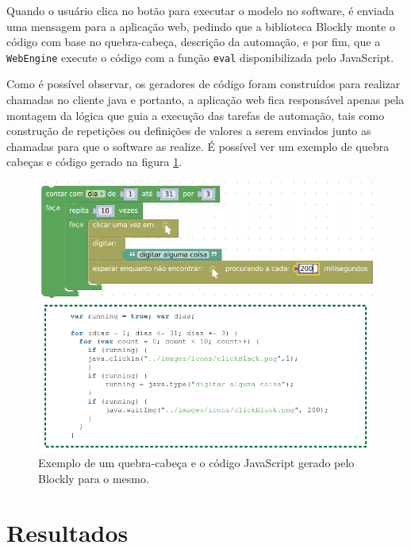\documentclass[tg]{mdtufsm}
\begin{document}
                    Quando o usuário clica no botão para executar o modelo no software, é enviada uma mensagem para a aplicação web, pedindo que a biblioteca Blockly monte o código com base no quebra-cabeça, descrição da automação, e por fim, que a \texttt{WebEngine} execute o código com a função \texttt{eval} disponibilizada pelo JavaScript.

                    Como é possível observar, os geradores de código foram construídos para realizar chamadas no cliente java e portanto, a aplicação web fica responsável apenas pela montagem da lógica que guia a execução das tarefas de automação, tais como construção de repetições ou definições de valores a serem enviados junto as chamadas para que o software as realize. É possível ver um exemplo de quebra cabeças e código gerado na figura \ref{fig:blocosecodigo}.

                    \begin{figure}[!htb]
                        {\centering
                        \includegraphics[width=1.0\textwidth]{imagens/blocosecodigo.png}
                        \caption{Exemplo de um quebra-cabeça e o código JavaScript gerado pelo Blockly para o mesmo.}
                        \label{fig:blocosecodigo}}
                    \end{figure}

        \chapter {Resultados}
\end{document}
